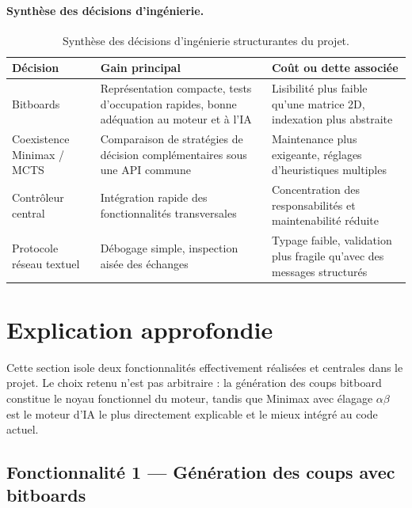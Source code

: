 \documentclass[a4paper]{article}
\providecommand{\toprule}{\hline}
\providecommand{\midrule}{\hline}
\providecommand{\bottomrule}{\hline}
\begin{document}
\paragraph{Synthèse des décisions d'ingénierie.}
\begin{table}[H]
\centering
\begin{tabular}{p{3.2cm} p{5.2cm} p{5.2cm}}
\toprule
\textbf{Décision} & \textbf{Gain principal} & \textbf{Coût ou dette associée} \\
\midrule
Bitboards & Représentation compacte, tests d'occupation rapides, bonne adéquation au moteur et à l'IA & Lisibilité plus faible qu'une matrice 2D, indexation plus abstraite \\
Coexistence Minimax / MCTS & Comparaison de stratégies de décision complémentaires sous une API commune & Maintenance plus exigeante, réglages d'heuristiques multiples \\
Contrôleur central & Intégration rapide des fonctionnalités transversales & Concentration des responsabilités et maintenabilité réduite \\
Protocole réseau textuel & Débogage simple, inspection aisée des échanges & Typage faible, validation plus fragile qu'avec des messages structurés \\
\bottomrule
\end{tabular}
\caption{Synthèse des décisions d'ingénierie structurantes du projet.}
\label{tab:engineering-decisions}
\end{table}


\section{Explication approfondie}
\label{sec:explication-approfondie}

Cette section isole deux fonctionnalités effectivement réalisées et centrales dans le projet. Le choix retenu n'est pas arbitraire : la génération des coups bitboard constitue le noyau fonctionnel du moteur, tandis que Minimax avec élagage $\alpha\beta$ est le moteur d'IA le plus directement explicable et le mieux intégré au code actuel.

\subsection{Fonctionnalité 1 --- Génération des coups avec bitboards}
\end{document}
